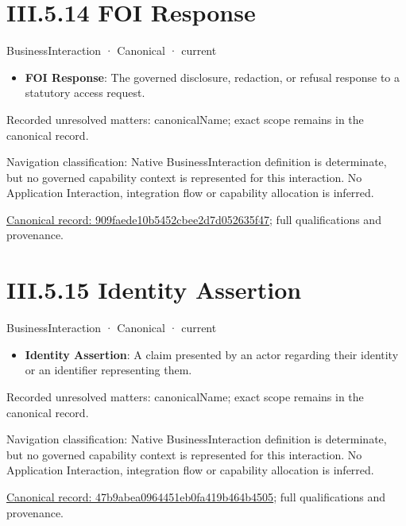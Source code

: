 \section*{III.5.14 FOI Response}
\label{navigation:III.5.14}

\label{element:909faede10b5452cbee2d7d052635f47}
{\small BusinessInteraction · Canonical · current}\par

\begin{itemize}


\item \textbf{FOI Response}: The governed disclosure, redaction, or refusal response to a statutory access request.

\end{itemize}

{\small Recorded unresolved matters: canonicalName; exact scope remains in the canonical record.}\par
{\small Navigation classification: Native BusinessInteraction definition is determinate, but no governed capability context is represented for this interaction. No Application Interaction, integration flow or capability allocation is inferred.}\par
{\footnotesize \href{../../../../continuum/business/business-interaction/909faede10b5452cbee2d7d052635f47.md}{Canonical record: 909faede10b5452cbee2d7d052635f47}; full qualifications and provenance.}\par
\section*{III.5.15 Identity Assertion}
\label{navigation:III.5.15}

\label{element:47b9abea0964451eb0fa419b464b4505}
{\small BusinessInteraction · Canonical · current}\par

\begin{itemize}


\item \textbf{Identity Assertion}: A claim presented by an actor regarding their identity or an identifier representing them.

\end{itemize}

{\small Recorded unresolved matters: canonicalName; exact scope remains in the canonical record.}\par
{\small Navigation classification: Native BusinessInteraction definition is determinate, but no governed capability context is represented for this interaction. No Application Interaction, integration flow or capability allocation is inferred.}\par
{\footnotesize \href{../../../../continuum/business/business-interaction/47b9abea0964451eb0fa419b464b4505.md}{Canonical record: 47b9abea0964451eb0fa419b464b4505}; full qualifications and provenance.}\par
